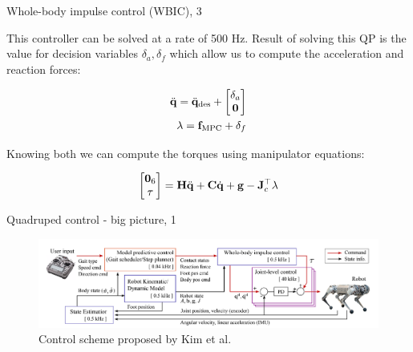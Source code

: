 \documentclass{beamer}
\begin{document}
\begin{frame}{Whole-body impulse control (WBIC), 3}
	\begin{flushleft}
		
		This controller can be solved at a rate of 500 Hz. Result of solving this QP is the value for decision variables $\delta_a, \delta_f$ which allow us to compute the acceleration and reaction forces:
		
		\begin{align}
			\ddot{\mathbf{q}} = \ddot{\mathbf{q}}_\text{des} + 
			\begin{bmatrix}
				\delta_a \\ \mathbf{0}
			\end{bmatrix} 
		\\
		\lambda  = \mathbf{f}_\text{MPC} +  \delta_f
		\end{align}
		
		Knowing both we can compute the torques using manipulator equations:
		
		\begin{equation}
			\begin{bmatrix}
				\mathbf{0}_6 \\ \tau
			\end{bmatrix}
		=
		\mathbf{H}\ddot{\mathbf{q}}
		+ \mathbf{C} \dot{\mathbf{q}} + \mathbf{g}
			-
			\mathbf{J}_c^\top \lambda 
		\end{equation}
		
	\end{flushleft}
\end{frame}




\begin{frame}{Quadruped control - big picture, 1}
	\begin{flushleft}
		
		\begin{figure}
			\centering
			\includegraphics[width=1.1\linewidth]{ControlSystemKim_1}
			\caption{Control scheme proposed by Kim et al.}
			\label{fig:controlsystemkim1}
		\end{figure}
		
	\end{flushleft}
\end{frame}
\end{document}

